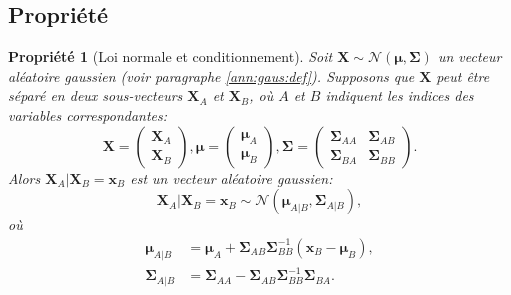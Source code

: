 \documentclass[twocolumn,10pt]{article}
\newtheorem{propriete}{Propriété}
\newcommand{\calN}{\mathcal{N}}
\newcommand{\bsX}{\boldsymbol{X}}
\newcommand{\bsXa}{\boldsymbol{X}_{{A}}}
\newcommand{\bsxb}{\boldsymbol{x}_{{B}}}
\newcommand{\bsXb}{\boldsymbol{X}_{{B}}}
\newcommand{\bsmu}{\boldsymbol{\mu}}
\newcommand{\bsSig}{\boldsymbol{\Sigma}}
\newcommand{\bsmua}{\boldsymbol{\mu}_{{A}}}
\newcommand{\bsmub}{\boldsymbol{\mu}_{{B}}}
\newcommand{\bsSigaa}{\boldsymbol{\Sigma}_{AA}}
\newcommand{\bsSigab}{\boldsymbol{\Sigma}_{AB}}
\newcommand{\bsSigba}{\boldsymbol{\Sigma}_{BA}}
\newcommand{\bsSigbb}{\boldsymbol{\Sigma}_{BB}}
\begin{document}
\subsection{Propriété}\label{ann:gaus:cond}

\begin{propriete}[Loi normale et conditionnement]\label{pro:cond:gaus}
Soit $\bsX\sim\calN(\bsmu,\bsSig)$ un vecteur aléatoire gaussien (voir paragraphe \ref{ann:gaus:def}). Supposons que $\bsX$ peut être séparé en deux sous-vecteurs $\bsXa$ et $\bsXb$, où $A$ et  $B$ indiquent les indices des variables correspondantes: 
\begin{equation*}
\bsX = \left(\begin{array}{c} \bsXa \\ \bsXb \end{array}\right) , 
\bsmu = \left(\begin{array}{c} \bsmua \\ \bsmub \end{array}\right) , 
\bsSig = \left(\begin{array}{cc} \bsSigaa & \bsSigab \\ \bsSigba & \bsSigbb \end{array}\right) . 
\end{equation*}
Alors $\bsXa|\bsXb=\bsxb$ est un vecteur aléatoire gaussien: %
\begin{equation}
\label{eqn:condgaus1}
\bsXa|\bsXb=\bsxb \sim \calN(\bsmu_{A|B},\bsSig_{A|B}) , 
\end{equation}
où 
\begin{align*}
\label{eqn:condgaus2}
\bsmu_{A|B} & = \bsmua + \bsSigab \bsSigbb^{-1} (\bsxb-\bsmub) , \\ 
\bsSig_{A|B} & = \bsSigaa - \bsSigab \bsSigbb^{-1} \bsSigba . 
\end{align*}
\end{propriete}





\end{document}
